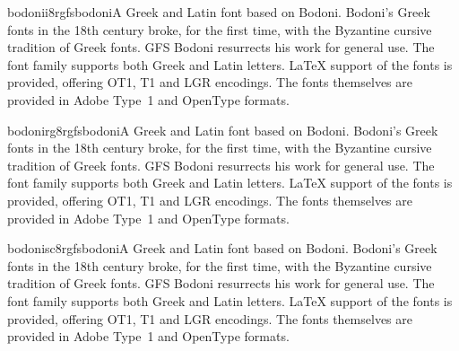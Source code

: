 \documentclass{ddltxtyp}
\begin{document}

\begin{package}{bodonii8r}{gfsbodoni}{A Greek and Latin font based on Bodoni.}
Bodoni's Greek fonts in the 18th century broke, for the first
time, with the Byzantine cursive tradition of Greek fonts. GFS
Bodoni resurrects his work for general use. The font family
supports both Greek and Latin letters. {\LaTeX} support of the
fonts is provided, offering OT1, T1 and LGR encodings. The
fonts themselves are provided in Adobe Type~1 and OpenType
formats.
\end{package}


\begin{package}{bodonirg8r}{gfsbodoni}{A Greek and Latin font based on Bodoni.}
Bodoni's Greek fonts in the 18th century broke, for the first
time, with the Byzantine cursive tradition of Greek fonts. GFS
Bodoni resurrects his work for general use. The font family
supports both Greek and Latin letters. {\LaTeX} support of the
fonts is provided, offering OT1, T1 and LGR encodings. The
fonts themselves are provided in Adobe Type~1 and OpenType
formats.
\end{package}

\begin{package}{bodonisc8r}{gfsbodoni}{A Greek and Latin font based on Bodoni.}
Bodoni's Greek fonts in the 18th century broke, for the first
time, with the Byzantine cursive tradition of Greek fonts. GFS
Bodoni resurrects his work for general use. The font family
supports both Greek and Latin letters. {\LaTeX} support of the
fonts is provided, offering OT1, T1 and LGR encodings. The
fonts themselves are provided in Adobe Type~1 and OpenType
formats.
\end{package}
\end{document}
